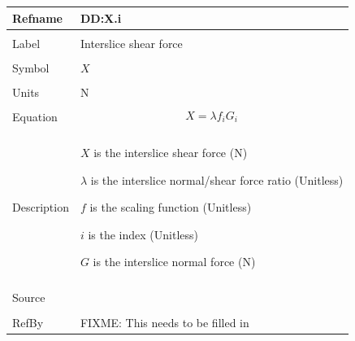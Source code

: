 \documentclass[12pt]{article}
\begin{document}
\noindent \begin{minipage}{\textwidth}
\begin{tabular}{p{} p{}}
\toprule \textbf{Refname} & \textbf{DD:X.i}
\label{DD:X.i}
\\ \midrule \\
Label & Interslice shear force
\\ \midrule \\
Symbol & $X$
\\ \midrule \\
Units & N
\\ \midrule \\
Equation & \begin{dmath}
           X=λ f_{i} G_{i}
           \end{dmath}
\\ \midrule \\
Description & \begin{symbDescription}
              \item{$X$ is the interslice shear force (N)}
              \item{$λ$ is the interslice normal/shear force ratio (Unitless)}
              \item{$f$ is the scaling function (Unitless)}
              \item{$i$ is the index (Unitless)}
              \item{$G$ is the interslice normal force (N)}
              \end{symbDescription}
\\ \midrule \\
Source & 
\\ \midrule \\
RefBy & FIXME: This needs to be filled in
\\ \bottomrule \end{tabular}
\end{minipage}\\
~\newline
\end{document}

